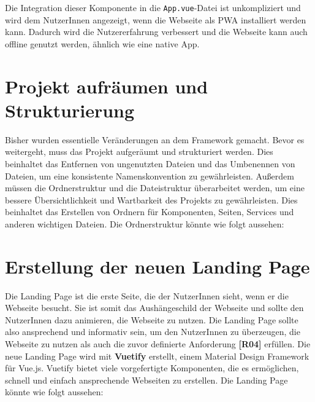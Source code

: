 Die Integration dieser Komponente in die \texttt{App.vue}-Datei ist unkompliziert und wird dem NutzerInnen angezeigt, wenn die Webseite als \acs{PWA} installiert werden kann. Dadurch wird die Nutzererfahrung verbessert und die Webseite kann auch offline genutzt werden, ähnlich wie eine native App. \cite{vite-plugin-pwa}

\section{Projekt aufräumen und Strukturierung}

Bisher wurden essentielle Veränderungen an dem Framework gemacht.
Bevor es weitergeht, muss das Projekt aufgeräumt und strukturiert werden.
Dies beinhaltet das Entfernen von ungenutzten Dateien und das Umbenennen von Dateien, um eine konsistente Namenskonvention zu gewährleisten.
Außerdem müssen die Ordnerstruktur und die Dateistruktur überarbeitet werden, um eine bessere Übersichtlichkeit und Wartbarkeit des Projekts zu gewährleisten.
Dies beinhaltet das Erstellen von Ordnern für Komponenten, Seiten, Services und anderen wichtigen Dateien.
Die Ordnerstruktur könnte wie folgt aussehen:


\section{Erstellung der neuen Landing Page}

Die Landing Page ist die erste Seite, die der NutzerInnen sieht, wenn er die Webseite besucht.
Sie ist somit das Aushängeschild der Webseite und sollte den NutzerInnen dazu animieren, die Webseite zu nutzen.
Die Landing Page sollte also ansprechend und informativ sein, um den NutzerInnen zu überzeugen, die Webseite zu nutzen als auch die zuvor definierte Anforderung \textbf{[R04]} erfüllen.
Die neue Landing Page wird mit \textbf{Vuetify} erstellt, einem Material Design Framework für Vue.js.
Vuetify bietet viele vorgefertigte Komponenten, die es ermöglichen, schnell und einfach ansprechende Webseiten zu erstellen.
Die Landing Page könnte wie folgt aussehen:

